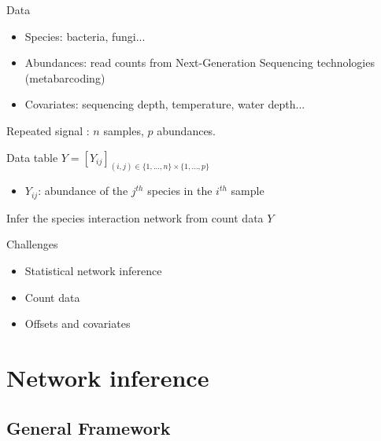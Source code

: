 \documentclass{beamer}
\newcommand{\emphase}[1]{\textcolor{Complement}{#1}}
\begin{document}
\begin{frame}{Data}
	\begin{itemize}
	\item \emphase{Species}: bacteria, fungi...
	\item \emphase{Abundances}: read counts from Next-Generation Sequencing technologies (metabarcoding)
	\item \emphase{Covariates}: sequencing depth, temperature, water depth... 
\end{itemize}
	Repeated signal : $n$ samples, $p$ abundances.
\begin{block}{Data table}
	$Y = [Y_{ij}]_{(i,j) \in \{1,...,n\} \times \{1,..., p\}} $
	\begin{itemize}
	\item $Y_{ij}$: abundance of the $j^{th}$ species in the $i^{th}$ sample
\end{itemize}
\end{block}
\begin{center}
	Infer the \emphase{species interaction network} from count data $Y$
\end{center}
\end{frame}
\begin{frame}{Challenges}\large{
	\begin{itemize}
	\item  Statistical network inference \bigskip\bigskip
	\item Count data \bigskip\bigskip
	\item Offsets and covariates
\end{itemize}}
\end{frame}

\section{Network inference}
\subsection{General Framework}
\end{document}
